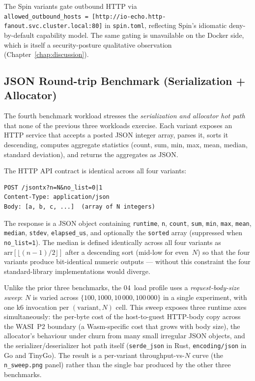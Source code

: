 \begin{sloppypar}
The Spin variants gate outbound \acs{HTTP} via \texttt{allowed\_outbound\_hosts~=~[\textquotedbl http://io-echo.http-fanout.svc.cluster.local:80\textquotedbl ]} in \texttt{spin.toml}, reflecting Spin's idiomatic deny-by-default capability model. The same gating is unavailable on the Docker side, which is itself a security-posture qualitative observation (Chapter~\ref{chap:discussion}).
\end{sloppypar}

\subsection{JSON Round-trip Benchmark (Serialization + Allocator)}
\label{sec:json_roundtrip_workload}

The fourth benchmark workload stresses the \textit{serialization and allocator hot path} that none of the previous three workloads exercise. Each variant exposes an \acs{HTTP} service that accepts a posted \acs{JSON} integer array, parses it, sorts it descending, computes aggregate statistics (count, sum, min, max, mean, median, standard deviation), and returns the aggregates as \acs{JSON}.

The \acs{HTTP} \acs{API} contract is identical across all four variants:

\begin{verbatim}
POST /jsontx?n=N&no_list=0|1
Content-Type: application/json
Body: [a, b, c, ...]  (array of N integers)
\end{verbatim}

\begin{sloppypar}
The response is a \acs{JSON} object containing \texttt{runtime}, \texttt{n}, \texttt{count}, \texttt{sum}, \texttt{min}, \texttt{max}, \texttt{mean}, \texttt{median}, \texttt{stdev}, \texttt{elapsed\_us}, and optionally the \texttt{sorted} array (suppressed when \texttt{no\_list=1}). The median is defined identically across all four variants as $\mathrm{arr}[\lfloor(n-1)/2\rfloor]$ after a descending sort (mid-low for even~$N$) so that the four variants produce bit-identical numeric outputs --- without this constraint the four standard-library implementations would diverge.
\end{sloppypar}

\begin{sloppypar}
Unlike the prior three benchmarks, the 04~load profile uses a \textit{request-body-size sweep}: $N$ is varied across $\{100, 1000, 10\,000, 100\,000\}$ in a single experiment, with one k6 invocation per $(\text{variant}, N)$ cell. This sweep exposes three runtime axes simultaneously: the per-byte cost of the host-to-guest \acs{HTTP}-body copy across the \acs{WASI}~P2 boundary (a Wasm-specific cost that grows with body size), the allocator's behaviour under churn from many small irregular \acs{JSON} objects, and the serializer/deserializer hot path itself (\texttt{serde\_json} in Rust, \texttt{encoding/json} in Go and TinyGo). The result is a per-variant throughput-vs-$N$ curve (the \texttt{n\_sweep.png} panel) rather than the single bar produced by the other three benchmarks.
\end{sloppypar}

